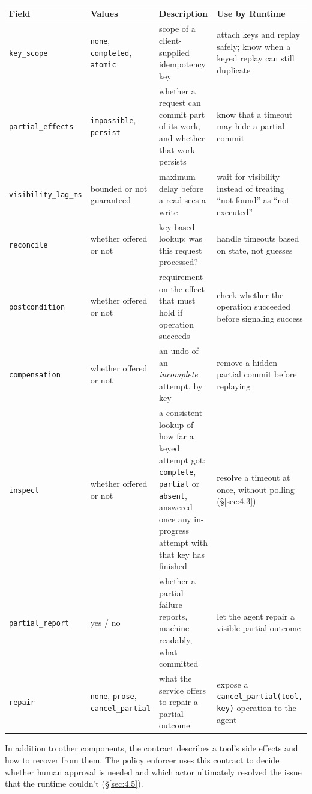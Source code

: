 \documentclass[letterpaper,twocolumn,10pt]{article}
\begin{document}
\begin{table}[t]
\centering
\footnotesize
\begin{tabularx}{\textwidth}{lXXX}
\toprule
\textbf{Field} & \textbf{Values} & \textbf{Description} & \textbf{Use by Runtime} \\
\midrule
\texttt{key\_scope} & \texttt{none}, \texttt{completed}, \texttt{atomic} & scope of a client-supplied idempotency key & attach keys and replay safely; know when a keyed replay can still duplicate \\
\texttt{partial\_effects} & \texttt{impossible}, \texttt{persist} & whether a request can commit part of its work, and whether that work persists & know that a timeout may hide a partial commit \\
\texttt{visibility\_lag\_ms} & bounded or not guaranteed & maximum delay before a read sees a write & wait for visibility instead of treating ``not found'' as ``not executed'' \\
\texttt{reconcile} & whether offered or not & key-based lookup: was this request processed? & handle timeouts based on state, not guesses \\
\texttt{postcondition} & whether offered or not & requirement on the effect that must hold if operation succeeds & check whether the operation succeeded before signaling success \\
\texttt{compensation} & whether offered or not & an undo of an \emph{incomplete} attempt, by key & remove a hidden partial commit before replaying \\
\texttt{inspect} & whether offered or not & a consistent lookup of how far a keyed attempt got: \texttt{complete}, \texttt{partial} or \texttt{absent}, answered once any in-progress attempt with that key has finished & resolve a timeout at once, without polling (\S\ref{sec:4.3}) \\
\texttt{partial\_report} & yes / no & whether a partial failure reports, machine-readably, what committed & let the agent repair a visible partial outcome \\
\texttt{repair} & \texttt{none}, \texttt{prose}, \texttt{cancel\_partial} & what the service offers to repair a partial outcome & expose a \texttt{cancel\_partial(tool, key)} operation to the agent \\
\bottomrule
\end{tabularx}

\end{table}

In addition to other components, the contract describes a tool's side effects and how to recover from them. The policy enforcer uses this contract to decide whether human approval is needed and which actor ultimately resolved the issue that the runtime couldn't (\S\ref{sec:4.5}).
\end{document}
